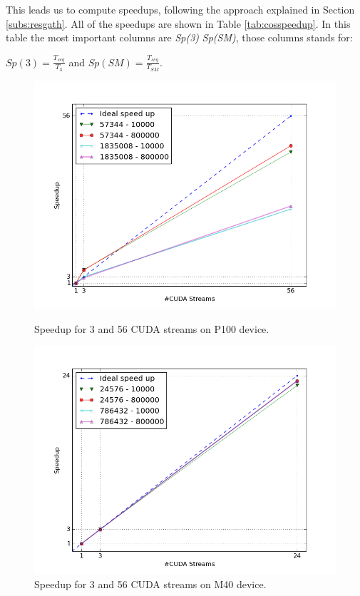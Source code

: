 			
	This leads us to compute speedups, following the approach explained in Section \ref{subs:resgath}. All of the speedups are shown in Table \ref{tab:cosspeedup}. In this table the most important columns are \textit{Sp(3)} \textit{Sp(SM)}, those columns stands for:
	\begin{center}
		\(Sp(3) =  \frac{T_{seq}}{T_{3}} \)  and   
		\(Sp(SM) = \frac{T_{seq}}{T_{SM}} \).\\
	\end{center}	
	\begin{figure}
		\vspace{-2cm}
		\includegraphics[scale=0.7]{plots/figure_25.png}
		\caption{Speedup for 3 and 56 CUDA streams on P100 device.}
		\label{fig:p100sp}
		\includegraphics[scale=0.7]{plots/figure_26.png}
		\caption{Speedup for 3 and 56 CUDA streams on M40 device.}
		\label{fig:m40sp}
	\end{figure}
